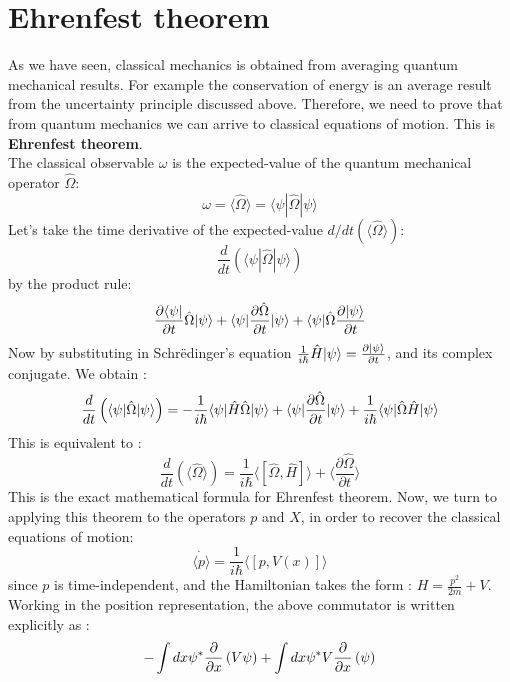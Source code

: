   \section{ Ehrenfest theorem}
  As we have seen, classical mechanics is obtained from averaging quantum mechanical results. For example the conservation of energy is an average result from the uncertainty principle discussed above. Therefore, we need to prove that from  quantum mechanics we can arrive to classical equations of motion. This is \textbf{Ehrenfest theorem}. \\
  The classical observable $ \omega$ is the expected-value of the quantum mechanical operator $ \hat{\Omega}$:
  \begin{equation}
  \omega = \langle \hat{ \Omega} \rangle = \langle \psi | \hat{\Omega}| \psi \rangle 
  \end{equation} 
  Let's take the time derivative of the expected-value $d/dt (\langle \hat{ \Omega} \rangle )$:
  \[
  \frac{d}{dt}\left( \langle \psi | \hat{\Omega}| \psi \rangle \right) 
  \]
  by the product rule:
  \[
  \frac{ \partial \langle \psi |}{\partial t} \hat{\Omega} | \psi \rangle + \langle \psi | \frac{\partial\hat{\Omega}}{\partial t} | \psi \rangle + \langle \psi | \hat{\Omega} \frac{\partial | \psi \rangle}{\partial t}
  \]
  Now by substituting in Schr\"{e}dinger's equation $  \frac{1}{i \hbar} \hat{H} | \psi \rangle =\frac{\partial | \psi \rangle}{\partial t}$, and its complex conjugate. We obtain :
  \[
  \frac{d}{dt}\left( \langle \psi | \hat{\Omega}| \psi \rangle \right)  =
  - \frac{1}{i \hbar} \langle \psi| \hat{H} \hat{\Omega} | \psi \rangle + \langle \psi | \frac{\partial\hat{\Omega}}{\partial t} | \psi \rangle + \frac{1}{i \hbar}  \langle \psi | \hat{\Omega} \hat{H} | \psi \rangle
  \]
  This is equivalent to :
  \begin{equation}
  \boxed{
  	\frac{d}{dt}\left(\langle \hat{\Omega} \rangle\right)  = \frac{1}{i\hbar} \langle [ \hat{\Omega}, \hat{H}]\rangle + \langle\dfrac{\partial \hat{\Omega}}{\partial t }\rangle
  }
  \end{equation}
  This is the exact mathematical formula for Ehrenfest theorem.
  Now, we turn to applying this theorem to the operators $ p$ and $ X $, in order to recover the classical equations of motion:
  \[
  \dot{\langle p\rangle }  = \frac{1}{i \hbar} \langle [p, V(x)]\rangle
  \]
  since $p$ is time-independent, and the Hamiltonian takes the form : $ H = \frac{p^2}{2m} +V$.\\
  Working in the position representation, the above commutator is written explicitly as :
  \[
  - \int dx \psi ^* \dfrac{\partial}{\partial x}\left( V \psi\right) + \int dx \psi ^* V \dfrac{\partial}{\partial x}\left( \psi \right) 
  \]
